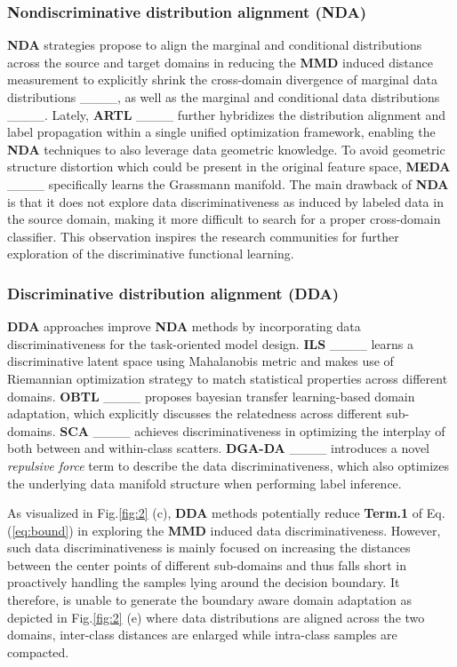 \subsubsection{Nondiscriminative distribution alignment (\textbf{NDA})} \textbf{NDA} strategies propose to align the marginal and conditional distributions across the source and target domains in reducing the \textbf{MMD} induced distance measurement to explicitly shrink the cross-domain divergence of marginal data distributions  ____, as well as the  marginal and conditional data distributions ____. Lately, \textbf{ARTL} ____ further hybridizes the distribution alignment and label propagation within a single unified optimization framework,  enabling the \textbf{NDA} techniques to also leverage data geometric knowledge. To avoid geometric structure distortion which could be present in the original feature space, \textbf{MEDA} ____ specifically learns the Grassmann manifold. The main drawback of \textbf{NDA} is that it does not explore data discriminativeness as induced by labeled data in the source domain, making it more difficult to search for a proper cross-domain classifier. This observation inspires the research communities for further exploration of the discriminative functional learning.



\subsubsection{Discriminative distribution alignment (\textbf{DDA})} \textbf{DDA} approaches improve \textbf{NDA} methods by incorporating data discriminativeness for the task-oriented model design.  \textbf{ILS} ____ learns a discriminative latent space using Mahalanobis metric and makes use of Riemannian optimization strategy to match statistical properties across different domains. \textbf{OBTL} ____ proposes bayesian transfer learning-based domain adaptation, which explicitly discusses the relatedness across different sub-domains.  \textbf{SCA} ____ achieves discriminativeness in optimizing the interplay of both between and within-class scatters. \textbf{DGA-DA} ____ introduces a novel \textit{repulsive force} term to describe the data discriminativeness, which also optimizes the underlying data manifold structure when performing label inference. 


As visualized in Fig.\ref{fig:2} (c),  \textbf{DDA} methods potentially reduce \textbf{Term.1} of Eq.(\ref{eq:bound}) in exploring the \textbf{MMD} induced data discriminativeness. However, such data discriminativeness is mainly focused on increasing the distances between the center points of different sub-domains and thus falls short in proactively handling the samples lying around the decision boundary. It therefore, is unable to generate the boundary aware domain adaptation as depicted in Fig.\ref{fig:2} (e) where data distributions are aligned across the two domains, inter-class distances are enlarged while intra-class samples are compacted. 





